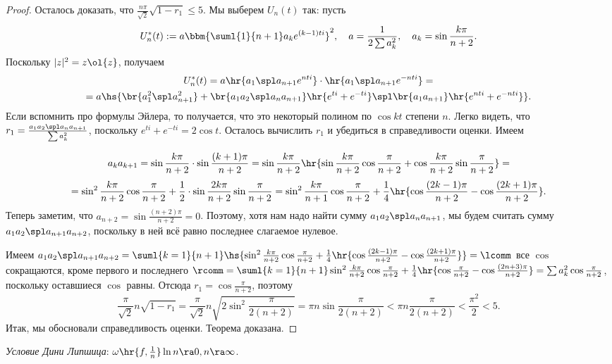 \documentclass[a4paper]{article}
\begin{document}
\begin{proof}
Осталось доказать, что $\frac{n\pi}{\sqrt{2}}\sqrt{1 - r_1} \le 5$. Мы выберем $U_n(t)$ так: пусть
$$U_n^*(t) := a \bbm{\suml{1}{n+1} a_k e^{(k-1)ti}}^2, \quad a = \frac{1}{2\sum a_k^2},
\quad a_k = \sin \frac{k\pi}{n+2}.$$
Поскольку $|z|^2 = z \ol{z}$, получаем
\begin{multline*}
U_n^*(t) = a\hr{a_1\spl a_{n+1}e^{nti}}\cdot\hr{a_1\spl a_{n+1}e^{-nti}} =\\=
a\hs{\br{a_1^2\spl a_{n+1}^2} + \br{a_1a_2\spl a_na_{n+1}}
\hr{e^{ti} + e^{-ti}}\spl \br{a_1a_{n+1}}\hr{e^{nti}+ e^{-nti}}}.
\end{multline*}
Если вспомнить про формулы Эйлера, то получается, что это некоторый
полином по $\cos kt$ степени $n$. Легко видеть, что $r_1 = \frac{a_1a_2\spl a_n a_{n+1}}{\sum a_k^2}$, поскольку $e^{ti}+e^{-ti} = 2\cos t$.
Осталось вычислить $r_1$ и убедиться в справедливости оценки. Имеем

$$a_k a_{k+1} = \sin\frac{k\pi}{n+2}\cdot\sin\frac{(k+1)\pi}{n+2}=
\sin\frac{k\pi}{n+2}\hr{\sin\frac{k\pi}{n+2}\cos\frac{\pi}{n+2}+\cos\frac{k\pi}{n+2}\sin\frac{\pi}{n+2}}=$$
$$=\sin^2\frac{k\pi}{n+2}\cos\frac{\pi}{n+2} +\frac{1}{2}\cdot\sin\frac{2k\pi}{n+2}\sin\frac{\pi}{n+2}=
\sin^2\frac{k\pi}{n+1}\cos\frac{\pi}{n+2} +\frac{1}{4}\hr{\cos\frac{(2k-1)\pi}{n+2} - \cos\frac{(2k+1)\pi}{n+2}}.$$ Теперь заметим, что
$a_{n+2} = \sin\frac{(n+2)\pi}{n+2} = 0$. Поэтому, хотя нам надо найти сумму $a_1a_2\spl a_na_{n+1}$, мы будем считать сумму $a_1a_2\spl a_{n+1}a_{n+2}$,
поскольку в ней всё равно последнее слагаемое нулевое.

Имеем $a_1a_2\spl a_{n+1}a_{n+2}=\suml{k=1}{n+1}\hs{\sin^2\frac{k\pi}{n+2}\cos\frac{\pi}{n+2} +\frac{1}{4}\hr{\cos\frac{(2k-1)\pi}{n+2} - \cos\frac{(2k+1)\pi}{n+2}}} =\lcomm$
все $\cos$ сокращаются, кроме первого и последнего $\rcomm = \suml{k=1}{n+1}\sin^2\frac{k\pi}{n+2}\cos\frac{\pi}{n+2} +\frac{1}{4}\hr{\cos\frac{\pi}{n+2} - \cos\frac{(2n+3)\pi}{n+2}}=
\sum a_k^2 \cos\frac{\pi}{n+2}$, поскольку оставшиеся $\cos$ равны. Отсюда $r_1 = \cos \frac{\pi}{n+2}$, поэтому
$$\frac{\pi}{\sqrt{2}}n\sqrt{1-r_1} =\frac{\pi}{\sqrt{2}}n\sqrt{2\sin^2 \frac{\pi}{2(n+2)}} = \pi n \sin \frac{\pi}{2(n+2)}
< \pi n \frac{\pi}{2(n+2)} < \frac{\pi^2}{2} < 5.$$
Итак, мы обосновали справедливость оценки. Теорема доказана.
\end{proof}

\begin{df}
\emph{Условие Дини Липшица}: $\omega\hr{f,\frac{1}{n}}\ln n \ra 0, n \ra \infty$.
\end{df}
\end{document}
